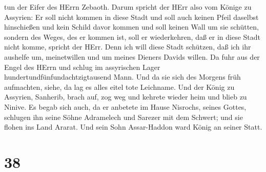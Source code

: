 tun der Eifer des HErrn Zebaoth.  Darum spricht der HErr
also vom Könige zu Assyrien: Er soll nicht kommen in diese Stadt und
soll auch keinen Pfeil daselbst hinschießen und kein Schild davor kommen
und soll keinen Wall um sie schütten,  sondern des Weges,
des er kommen ist, soll er wiederkehren, daß er in diese Stadt nicht
komme, spricht der HErr.  Denn ich will diese Stadt
schützen, daß ich ihr aushelfe um, meinetwillen und um meines Dieners
Davids willen.  Da fuhr aus der Engel des HErrn und schlug
im assyrischen Lager hundertundfünfundachtzigtausend Mann. Und da sie
sich des Morgens früh aufmachten, siehe, da lag es alles eitel tote
Leichname.  Und der König zu Assyrien, Sanherib, brach auf,
zog weg und kehrete wieder heim und blieb zu Ninive.  Es
begab sich auch, da er anbetete im Hause Nisrochs, seines Gottes,
schlugen ihn seine Söhne Adramelech und Sarezer mit dem Schwert; und sie
flohen ins Land Ararat. Und sein Sohn Assar-Haddon ward König an seiner
Statt.

\hypertarget{section-37}{%
\section{38}\label{section-37}}

